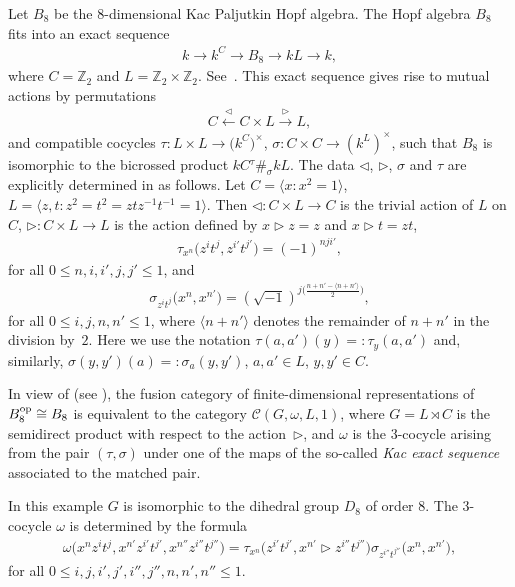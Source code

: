 \documentclass[11pt]{article}
\numberwithin{equation}{section}
\newcommand{\C}{{\mathcal C}}
\newcommand{\1}{\textbf{1}}
\begin{document}
\begin{Example}\label{kp}
Let $B_8$ be the 8-dimensional Kac Paljutkin Hopf algebra. The Hopf algebra $B_8$ f\/its into an exact sequence
\begin{gather*}
k \longrightarrow k^C \longrightarrow B_8 \longrightarrow kL \longrightarrow k,
\end{gather*}
where $C = \mathbb Z_2$ and $L = \mathbb Z_2 \times \mathbb Z_2$. See~\cite{masuoka-6-8}. This exact sequence gives rise to mutual actions by permutations
\begin{gather*}C \overset{\vartriangleleft}\longleftarrow C \times L
\overset{\vartriangleright}\longrightarrow L,\end{gather*}
and compatible cocycles $\tau\colon L \times L \to \big(k^C\big)^\times$, $\sigma\colon C \times C \to (k^L)^\times$, such that $B_8$ is isomorphic to the bicrossed product $kC {}^{\tau}\#_\sigma kL$. The data $\lhd$, $\rhd$, $\sigma$ and $\tau$ are explicitly determined in \cite[Proposition~3.11]{ma-contemp} as follows. Let $C = \langle x\colon x^2 = 1 \rangle$, $L = \langle z, t\colon z^2 = t^2 = ztz^{-1}t^{-1} = 1\rangle$. Then $\lhd\colon C\times L \to C$ is the trivial action of $L$ on $C$, $\rhd\colon C \times L \to L$ is the action def\/ined by $x \rhd z = z$ and $x\rhd t = zt$,
\begin{gather*}\tau_{x^n}\big(z^it^j, z^{i'}t^{j'}\big) = (-1)^{nji'},\end{gather*} for all $0\leq n, i, i', j, j' \leq 1$,
and
\begin{gather*}\sigma_{z^it^j}\big(x^n, x^{n'}\big) = (\sqrt{-1})^{j\big(\frac{n+n'-\langle n+n'\rangle}{2}\big)},\end{gather*}
for all $0 \leq i, j, n, n' \leq 1$, where $\langle n+n'\rangle$ denotes the remainder of $n+n'$ in the division by~$2$. Here we use the notation $\tau(a, a')(y) = : \tau_y(a, a')$ and, similarly, $\sigma(y, y')(a) = : \sigma_a(y, y')$, $a, a' \in L$, $y, y' \in C$.

In view of \cite[Theorem~3.3.5]{schauenburg} (see \cite[Proposition~4.3]{gttic}), the fusion category of f\/inite-dimen\-sio\-nal representations of $B_8^{\rm op} \cong B_8$ is equivalent to the category $\C(G, \omega, L, 1)$, where $G = L \rtimes C$ is the semidirect product with respect to the action~$\rhd$, and $\omega$ is the 3-cocycle arising from the pair $(\tau, \sigma)$ under one of the maps of the so-called \emph{Kac exact sequence} associated to the matched pair.

In this example $G$ is isomorphic to the dihedral group $D_8$ of order 8. The 3-cocycle $\omega$ is determined by the formula
\begin{gather}\label{kac}\omega\big(x^{n}z^{i}t^{j}, x^{n'}z^{i'}t^{j'}, x^{n''}z^{i''}t^{j''}\big) =
\tau_{x^n}\big(z^{i'}t^{j'}, x^{n'} \rhd z^{i''}t^{j''}\big) \sigma_{z^{i''}t^{j''}}\big(x^n, x^{n'}\big),\end{gather}
for all $0 \leq i, j, i', j', i'', j'', n, n', n'' \leq 1$.


\end{Example}
\end{document}
